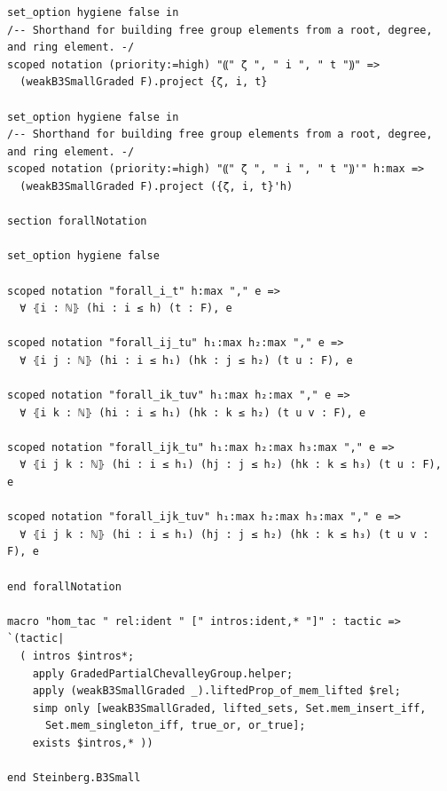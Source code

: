 \documentclass[10pt,a4paper]{article}
\begin{document}
\begin{Verbatim}
set_option hygiene false in
/-- Shorthand for building free group elements from a root, degree, and ring element. -/
scoped notation (priority:=high) "⸨" ζ ", " i ", " t "⸩" =>
  (weakB3SmallGraded F).project {ζ, i, t}

set_option hygiene false in
/-- Shorthand for building free group elements from a root, degree, and ring element. -/
scoped notation (priority:=high) "⸨" ζ ", " i ", " t "⸩'" h:max =>
  (weakB3SmallGraded F).project ({ζ, i, t}'h)

section forallNotation

set_option hygiene false

scoped notation "forall_i_t" h:max "," e =>
  ∀ ⦃i : ℕ⦄ (hi : i ≤ h) (t : F), e

scoped notation "forall_ij_tu" h₁:max h₂:max "," e =>
  ∀ ⦃i j : ℕ⦄ (hi : i ≤ h₁) (hk : j ≤ h₂) (t u : F), e

scoped notation "forall_ik_tuv" h₁:max h₂:max "," e =>
  ∀ ⦃i k : ℕ⦄ (hi : i ≤ h₁) (hk : k ≤ h₂) (t u v : F), e

scoped notation "forall_ijk_tu" h₁:max h₂:max h₃:max "," e =>
  ∀ ⦃i j k : ℕ⦄ (hi : i ≤ h₁) (hj : j ≤ h₂) (hk : k ≤ h₃) (t u : F), e

scoped notation "forall_ijk_tuv" h₁:max h₂:max h₃:max "," e =>
  ∀ ⦃i j k : ℕ⦄ (hi : i ≤ h₁) (hj : j ≤ h₂) (hk : k ≤ h₃) (t u v : F), e

end forallNotation

macro "hom_tac " rel:ident " [" intros:ident,* "]" : tactic => `(tactic|
  ( intros $intros*;
    apply GradedPartialChevalleyGroup.helper;
    apply (weakB3SmallGraded _).liftedProp_of_mem_lifted $rel;
    simp only [weakB3SmallGraded, lifted_sets, Set.mem_insert_iff,
      Set.mem_singleton_iff, true_or, or_true];
    exists $intros,* ))

end Steinberg.B3Small
\end{Verbatim}
\end{document}
